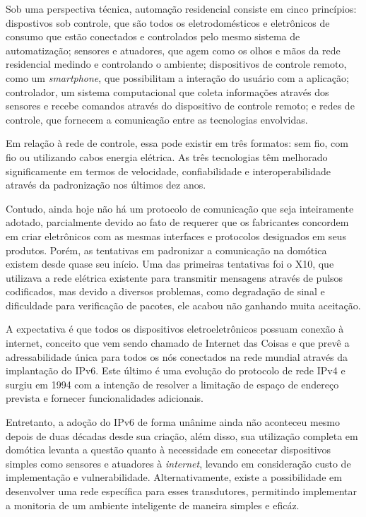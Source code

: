 \documentclass[
    12pt,               %
    a4paper,            %
    english,            %
    brazil,             %
    ]{article}
\begin{document}
Sob uma perspectiva técnica, automação residencial consiste em cinco princípios: dispostivos sob controle, que são todos os
eletrodomésticos e eletrônicos de consumo que estão conectados e controlados pelo mesmo sistema de automatização; sensores e
atuadores, que agem como os olhos e mãos da rede residencial medindo e controlando o ambiente; dispositivos de controle remoto,
como um \textit{smartphone}, que possibilitam a interação do usuário com a aplicação; controlador, um sistema computacional que
coleta informações através dos sensores e recebe comandos através do dispositivo de controle remoto; e redes de controle, que
fornecem a comunicação entre as tecnologias envolvidas. \cite{kyas2013}

Em relação à rede de controle, essa pode existir em três formatos: sem fio, com fio ou utilizando cabos energia elétrica. As três
tecnologias têm melhorado significamente em termos de velocidade, confiabilidade e interoperabilidade através da padronização nos
últimos dez anos. \cite{kyas2013}

Contudo, ainda hoje não há um protocolo de comunicação que seja inteiramente adotado, parcialmente devido ao fato de requerer que
os fabricantes concordem em criar eletrônicos com as mesmas interfaces e protocolos designados em seus produtos. Porém, as
tentativas em padronizar a comunicação na domótica existem desde quase seu início. Uma das primeiras tentativas foi o X10, que
utilizava a rede elétrica existente para transmitir mensagens através de pulsos codificados, mas devido a diversos problemas, como
degradação de sinal e dificuldade para verificação de pacotes, ele acabou não ganhando muita aceitação. \cite{riley2012}

A expectativa é que todos os dispositivos eletroeletrônicos possuam conexão à internet, conceito que vem sendo chamado de Internet
das Coisas e que prevê a adressabilidade única para todos os nós conectados na rede mundial através da implantação do IPv6. Este
último é uma evolução do protocolo de rede IPv4 e surgiu em 1994 com a intenção de resolver a limitação de espaço de endereço
prevista e fornecer funcionalidades adicionais. \cite{hagen2002}

Entretanto, a adoção do IPv6 de forma unânime ainda não aconteceu mesmo depois de duas décadas desde sua criação, além disso, sua
utilização completa em domótica levanta a questão quanto à necessidade em conecetar dispositivos simples como sensores e atuadores
à \textit{internet}, levando em consideração custo de implementação e vulnerabilidade. Alternativamente, existe a possibilidade em
desenvolver uma rede específica para esses transdutores, permitindo implementar a monitoria de um ambiente inteligente de maneira
simples e eficáz.
\end{document}
